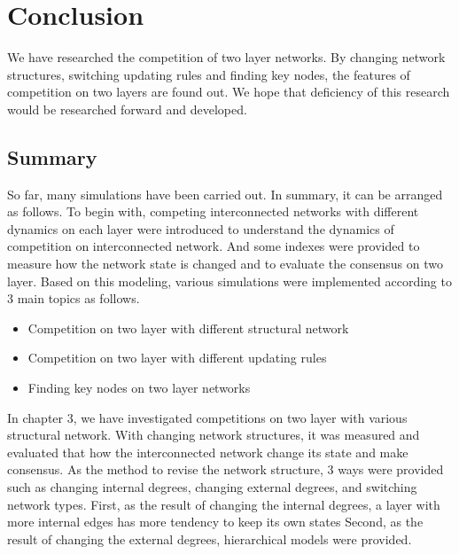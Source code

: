 
\chapter{Conclusion}
\label{chap:conclusion}
We have researched the competition of two layer networks. By changing network structures, switching updating rules and finding key nodes, the features of competition on two layers are found out. We hope that deficiency of this research would be researched forward and developed. 
\section{Summary}
So far, many simulations have been carried out. In summary, it can be arranged as follows. 
To begin with, competing interconnected networks with  different dynamics on each layer were introduced to understand the dynamics of competition on interconnected network.  And some indexes were provided to measure how the network state is changed and to evaluate the consensus on two layer. Based on this modeling, various simulations were implemented according to 3 main topics as follows.

\begin{itemize}
\item Competition on two layer with different structural network
\item Competition on two layer with different updating rules
\item Finding key nodes on two layer networks
\end{itemize}

In chapter 3, we have investigated competitions on two layer with various structural network. With changing network structures, it was measured and evaluated that how the interconnected network change its state and make consensus. As the method to revise the network structure, 3 ways were provided such as changing internal degrees, changing external degrees, and switching network types. 
First, as the result of changing the internal degrees, a layer with more internal edges has more tendency to keep its own states
Second, as the result of changing the external degrees, hierarchical models were provided. 

